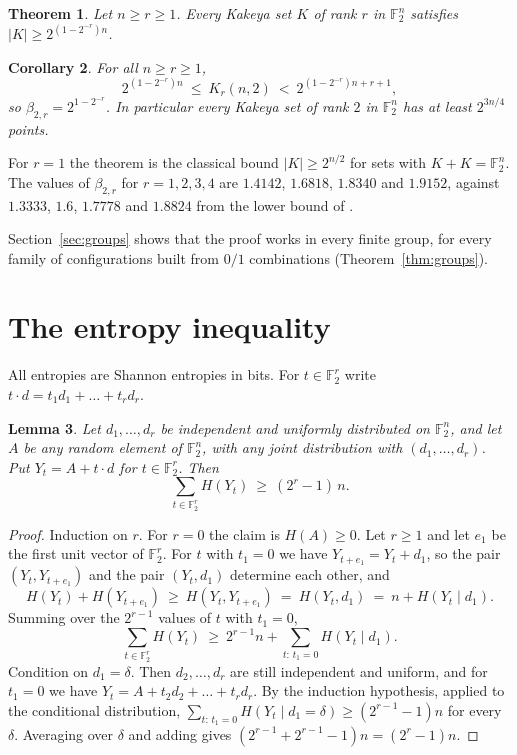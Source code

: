 \documentclass[11pt]{amsart}
\newtheorem{theorem}{Theorem}
\newtheorem{lemma}[theorem]{Lemma}
\newtheorem{corollary}[theorem]{Corollary}
\theoremstyle{remark}
\newcommand{\F}{\mathbb{F}}
\begin{document}
\begin{theorem}\label{thm:main}
Let $n\ge r\ge 1$. Every Kakeya set $K$ of rank $r$ in $\F_2^n$ satisfies
$|K|\ge 2^{(1-2^{-r})n}$.
\end{theorem}

\begin{corollary}
For all $n\ge r\ge 1$,
\[
  2^{(1-2^{-r})n}\ \le\ K_r(n,2)\ <\ 2^{(1-2^{-r})n+r+1},
\]
so $\beta_{2,r}=2^{1-2^{-r}}$. In particular every Kakeya set of rank $2$ in $\F_2^n$ has at least
$2^{3n/4}$ points.
\end{corollary}

For $r=1$ the theorem is the classical bound $|K|\ge 2^{n/2}$ for sets with $K+K=\F_2^n$. The
values of $\beta_{2,r}$ for $r=1,2,3,4$ are $1.4142$, $1.6818$, $1.8340$ and $1.9152$, against
$1.3333$, $1.6$, $1.7778$ and $1.8824$ from the lower bound of \cite{KLSS}.

Section~\ref{sec:groups} shows that the proof works in every finite group, for every family of
configurations built from $0/1$ combinations (Theorem~\ref{thm:groups}).

\section{The entropy inequality}

All entropies are Shannon entropies in bits. For $t\in\F_2^r$ write
$t\cdot d=t_1d_1+\dots+t_rd_r$.

\begin{lemma}\label{lem:entropy}
Let $d_1,\dots,d_r$ be independent and uniformly distributed on $\F_2^n$, and let $A$ be any
random element of $\F_2^n$, with any joint distribution with $(d_1,\dots,d_r)$. Put
$Y_t=A+t\cdot d$ for $t\in\F_2^r$. Then
\[
  \sum_{t\in\F_2^r}H(Y_t)\ \ge\ (2^r-1)\,n.
\]
\end{lemma}

\begin{proof}
Induction on $r$. For $r=0$ the claim is $H(A)\ge 0$. Let $r\ge1$ and let $e_1$ be the first unit
vector of $\F_2^r$. For $t$ with $t_1=0$ we have $Y_{t+e_1}=Y_t+d_1$, so the pair
$(Y_t,Y_{t+e_1})$ and the pair $(Y_t,d_1)$ determine each other, and
\[
  H(Y_t)+H(Y_{t+e_1})\ \ge\ H(Y_t,Y_{t+e_1})\ =\ H(Y_t,d_1)\ =\ n+H(Y_t\mid d_1).
\]
Summing over the $2^{r-1}$ values of $t$ with $t_1=0$,
\[
  \sum_{t\in\F_2^r}H(Y_t)\ \ge\ 2^{r-1}n+\sum_{t:\,t_1=0}H(Y_t\mid d_1).
\]
Condition on $d_1=\delta$. Then $d_2,\dots,d_r$ are still independent and uniform, and for
$t_1=0$ we have $Y_t=A+t_2d_2+\dots+t_rd_r$. By the induction hypothesis, applied to the
conditional distribution, $\sum_{t:\,t_1=0}H(Y_t\mid d_1=\delta)\ge(2^{r-1}-1)n$ for every
$\delta$. Averaging over $\delta$ and adding gives $(2^{r-1}+2^{r-1}-1)n=(2^r-1)n$.
\end{proof}
\end{document}
